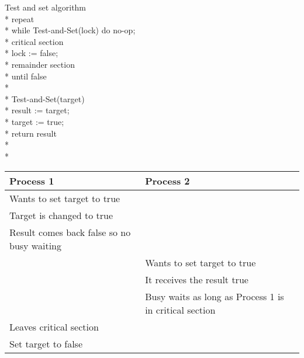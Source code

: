 Test and set algorithm\\*
repeat\\*
while Test-and-Set(lock) do no-op;\\*
critical section \\*
lock := false;\\*
remainder section \\*
until false \\*\\*
Test-and-Set(target) \\*
result := target;\\*
target := true; \\*
return result \\*\\*
\begin{tabular}{ |p{4.0cm}| p{4.0cm} | }
  \hline                       
  Process 1	& Process 2 \\ \hline 
  Wants to set target to true & \\
  Target is changed to true & \\
  Result comes back false so no busy waiting &\\
  & Wants to set target to true \\
  & It receives the result true \\
  & Busy waits as long as Process 1 is in critical section \\
  Leaves critical section & \\
  Set target to false & \\
  \hline  
\end{tabular}
